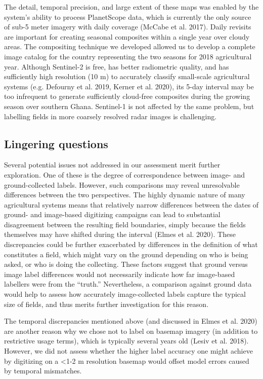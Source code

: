 \documentclass[11pt,a4paper]{article}
\begin{document}
The detail, temporal precision, and large extent of these maps was
enabled by the system's ability to process PlanetScope data, which is
currently the only source of sub-5 meter imagery with daily coverage
(McCabe et al. 2017). Daily revisits are important for creating seasonal
composites within a single year over cloudy areas. The compositing
technique we developed allowed us to develop a complete image catalog
for the country representing the two seasons for 2018 agricultural year.
Although Sentinel-2 is free, has better radiometric quality, and has
sufficiently high resolution (10 m) to accurately classify small-scale
agricultural systems (e.g. Defourny et al. 2019, Kerner et al. 2020),
its 5-day interval may be too infrequent to generate sufficiently
cloud-free composites during the growing season over southern Ghana.
Sentinel-1 is not affected by the same problem, but labelling fields in
more coarsely resolved radar images is challenging.

\hypertarget{lingering-questions}{%
\subsection{Lingering questions}\label{lingering-questions}}

Several potential issues not addressed in our assessment merit further
exploration. One of these is the degree of correspondence between image-
and ground-collected labels. However, such comparisons may reveal
unresolvable differences between the two perspectives. The highly
dynamic nature of many agricultural systems means that relatively narrow
differences between the dates of ground- and image-based digitizing
campaigns can lead to substantial disagreement between the resulting
field boundaries, simply because the fields themselves may have shifted
during the interval (Elmes et al. 2020). These discrepancies could be
further exacerbated by differences in the definition of what constitutes
a field, which might vary on the ground depending on who is being asked,
or who is doing the collecting. These factors suggest that ground versus
image label differences would not necessarily indicate how far
image-based labellers were from the ``truth.'' Nevertheless, a
comparison against ground data would help to assess how accurately
image-collected labels capture the typical size of fields, and thus
merits further investigation for this reason.

The temporal discrepancies mentioned above (and discussed in Elmes et
al. 2020) are another reason why we chose not to label on basemap
imagery (in addition to restrictive usage terms), which is typically
several years old (Lesiv et al. 2018). However, we did not assess
whether the higher label accuracy one might achieve by digitizing on a
\textless1-2 m resolution basemap would offset model errors caused by
temporal mismatches.
\end{document}
